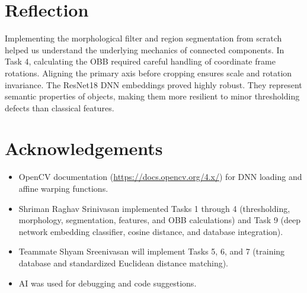 \documentclass[11pt,letterpaper]{article}
\begin{document}
\section*{Reflection}

Implementing the morphological filter and region segmentation from scratch helped us understand the underlying mechanics of connected components. In Task 4, calculating the OBB required careful handling of coordinate frame rotations. Aligning the primary axis before cropping ensures scale and rotation invariance. The ResNet18 DNN embeddings proved highly robust. They represent semantic properties of objects, making them more resilient to minor thresholding defects than classical features.

\section*{Acknowledgements}

\begin{itemize}
    \item OpenCV documentation (\url{https://docs.opencv.org/4.x/}) for DNN loading and affine warping functions.
    \item Shriman Raghav Srinivasan implemented Tasks 1 through 4 (thresholding, morphology, segmentation, features, and OBB calculations) and Task 9 (deep network embedding classifier, cosine distance, and database integration).
    \item Teammate Shyam Sreenivasan will implement Tasks 5, 6, and 7 (training database and standardized Euclidean distance matching).
    \item AI was used for debugging and code suggestions.
\end{itemize}
\end{document}
